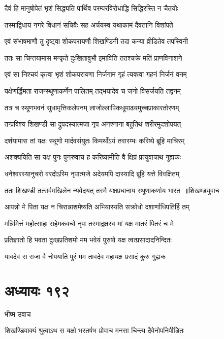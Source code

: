 \twolineshloka
{दैवं हि मानुषोपेतं भृशं सिद्ध्यति पार्थिव}
{परम्परविरोधाद्धि सिद्धिरस्ति न चैतयोः}


\twolineshloka
{तस्माद्विधाय नगरे विधानं सचिवैः सह}
{अर्चयस्व यथाकामं दैवतानि विशांपते}


\twolineshloka
{एवं संभाषमाणौ तु दृष्ट्वा शोकपरायणौ}
{शिखण्डिनी तदा कन्या व्रीडितेव तपस्विनी}


\twolineshloka
{ततः सा चिन्तयामास मन्कृते दुःखितावुभौ}
{इमाविति ततश्चक्रे मतिं प्राणविनाशने}


\twolineshloka
{एवं सा निश्चयं कृत्वा भृशं शोकपरायणा}
{निर्जगाम गृहं त्यक्त्वा गहनं निर्जनं वनम्}


\twolineshloka
{यक्षेणर्द्धिमता राजन्स्थूणाकर्णेन पालितम्}
{तद्भयादेव च जनो विसर्जयति तद्वनम्}


\twolineshloka
{तत्र च स्थूणभवनं सुधामृत्तिकलेपनम्}
{लाजोल्लापिकधूमाढ्यमुच्चप्राकारतोरणम्}


\twolineshloka
{तन्प्रविश्य शिखण्डी सा द्रुपदस्यात्मजा नृप}
{अनश्नाना बहुतिथं शरीरमुदशोपयत्}


\twolineshloka
{दर्शयामास तां यक्षः स्थूणो मार्दवसंयुतः}
{किमर्थोऽयं तवारम्भः करिष्ये ब्रूहि माचिरम्}


\twolineshloka
{अशक्ययिति सा यक्षं पुनः पुनरुवाच ह}
{करिष्यामीति वै क्षिप्रं प्रत्युवाचाथ गुह्यकः}


\twolineshloka
{धनेश्वरस्यानुचरो वरदोऽस्मि नृपात्मजे}
{अदेयमपि दास्यादि ब्रूहि यत्ते विवक्षितम्}


\threelineshloka
{ततः शिखण्डी तत्सर्वमखिलेन न्यवेदयत्}
{तस्मै यक्षप्रधानाय स्थूणाकर्णाय भारत ॥शिखण्ड्युवाच}
{}


\twolineshloka
{आपन्नो मे पिता यक्ष न चिरान्नाशमेष्यति}
{अभियास्यति सक्रोधो दशार्णाधिपतिर्हि तम्}


\twolineshloka
{मन्निमित्तं महोत्साहः सहेमकवचो नृपः}
{तस्माद्रक्षस्व मां यक्ष मातरं पितरं च मे}


\twolineshloka
{प्रतिज्ञातो हि भवता दुःखप्रतिशमो मम}
{भवेयं पुरुषो यक्ष त्वत्प्रसादादनिन्दितः}


\twolineshloka
{यावदेव स राजा वै नोपयाति पुरं मम}
{तावदेव महायक्ष प्रसादं कुरु गुह्यक}


\chapter{अध्यायः १९२}
\twolineshloka
{भीष्म उवाच}
{}


\twolineshloka
{शिखण्डिवाक्यं श्रुत्वाऽथ स यक्षो भरतर्षभ}
{प्रोवाच मनसा चिन्त्य दैवेनोपनिपीडितः}


